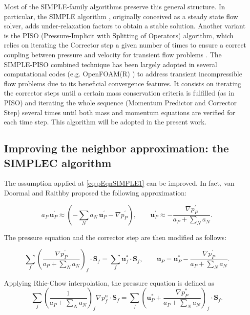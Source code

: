 \documentclass[final,3p,times,10pt,onecolumn]{myElsarticle}
\numberwithin{equation}{section}
\begin{document}
\fi
Most of the SIMPLE-family algorithms preserve this general structure. In particular, the SIMPLE algorithm \cite{patankar1972}, originally conceived as a steady state flow solver, adds under-relaxation factors to obtain a stable solution. Another variant is the PISO {\color{red}(Pressure-Implicit with Splitting of Operators)} algorithm, which relies on iterating the Corrector step a given number of times to ensure a correct coupling between pressure and velocity for transient flow problems \cite{issa,issa2}. {\color{red} The SIMPLE-PISO combined technique has been largely adopted in several computational codes (e.g. OpenFOAM(R) \cite{ofpg}) to address transient incompressible flow problems due to its beneficial convergence features. It consists on iterating the corrector steps until a certain mass conservation criteria is fulfilled (as in PISO) and iterating the whole sequence (Momentum Predictor and Corrector Step) several times until both mass and momentum equations are verified for each time step. This algorithm will be adopted in the present work.}

\subsection{Improving the neighbor approximation: the SIMPLEC algorithm}
The assumption applied at \ref{eq:pEqnSIMPLE1} can be improved. In fact, van Doormal and Raithby \cite{vanDoormal} proposed the following approximation:

\begin{equation}\label{eq:uPrimeSIMPLEC}
a_P\,\boldsymbol{u}_P^{'} \approx \left(-\sum_{N} a_{N}\, \boldsymbol{u}_P^{'} - \nabla p_P^{'}\right), \qquad \boldsymbol{u}_P^{'} \approx - \frac{\nabla p_P^{'}}{a_P + \sum_{N} a_{N}}.
\end{equation}

The pressure equation and the corrector step are then modified as follows:

\begin{equation}\label{eq:pEqnSIMPLEC}
\sum_f \left(\frac{\nabla p_P^{'}}{a_P + \sum_{N} a_{N}}\right)_f \cdot \boldsymbol{S}_f= \sum_f \boldsymbol{u}_f^{*}\cdot \boldsymbol{S}_f, \qquad \boldsymbol{u}_P = \boldsymbol{u}_P^* - \frac{\nabla p_P^{'}}{a_P + \sum_{N} a_{N}}.
\end{equation}

Applying Rhie-Chow interpolation, the pressure equation  is defined as
\begin{equation}\label{eq:pEqnSIMPLEC-RC}
\sum_f \left(\frac{1}{a_P + \sum_{N} a_{N}}\right)_f \nabla p_f^{n}\cdot \boldsymbol{S}_f = \sum_f \left(\boldsymbol{u}_P^{*} + \frac{\nabla p_P^{*}}{a_P + \sum_{N} a_{N}}\right)_f\cdot \boldsymbol{S}_f .
\end{equation}
\end{document}
